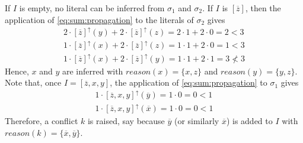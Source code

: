\begin{example} \label{ex:sumpropagator}
    If $I$ is empty, no literal can be inferred from $\sigma_1$ and $\sigma_2$.
    If $I$ is $[\overline{z}]$, then the application of \eqref{eq:sum:propagation} to the literals of $\sigma_2$ gives
    \begin{align*}
        2 \cdot [\overline{z}]^\uparrow(y) + 2 \cdot [\overline{z}]^\uparrow(z) = 2 \cdot 1 + 2 \cdot 0 = 2 < 3\\
        1 \cdot [\overline{z}]^\uparrow(x) + 2 \cdot [\overline{z}]^\uparrow(z) = 1\cdot 1 + 2 \cdot 0 = 1 < 3\\
        1 \cdot [\overline{z}]^\uparrow(x) + 2 \cdot [\overline{z}]^\uparrow(y) = 1 \cdot 1 + 2 \cdot 1 = 3 \not< 3
    \end{align*}
    Hence, $x$ and $y$ are inferred with
    $\mathit{reason}(x) = \{x,z\}$ and
    $\mathit{reason}(y) = \{y,z\}$.
    Note that, once $I = [\overline{z},x,y]$, the application of \eqref{eq:sum:propagation} to $\sigma_1$ gives
    \begin{align*}
        1 \cdot [\overline{z},x,y]^\uparrow(\overline{y}) = 1 \cdot 0 = 0 < 1\\
        1 \cdot [\overline{z},x,y]^\uparrow(\overline{x}) = 1 \cdot 0 = 0 < 1
    \end{align*}
    Therefore, a conflict $k$ is raised, say because $\overline{y}$ (or similarly $\overline{x}$) 
    is added to $I$ with $\mathit{reason}(k) = \{\overline{x}, \overline{y}\}$.
\end{example}